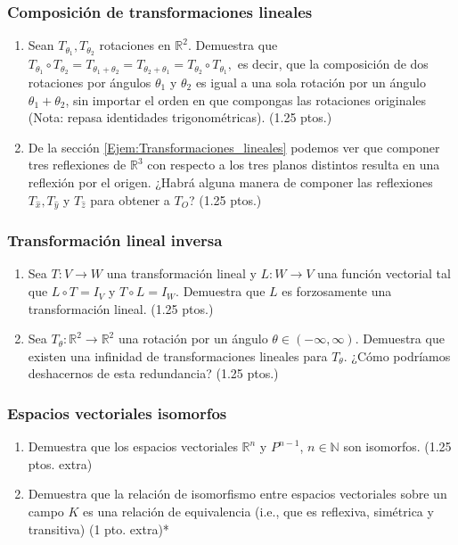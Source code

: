 \documentclass[12pt]{article}
\begin{document}
\subsubsection{Composición de transformaciones lineales}

\begin{enumerate}
    \item Sean $T_{\theta_1}, T_{\theta_2}$ rotaciones en $\mathbb{R}^2$. Demuestra que $T_{\theta_1}\circ T_{\theta_2} = T_{\theta_1+\theta_2} = T_{\theta_2+\theta_1} = T_{\theta_2}\circ T_{\theta_1},$ es decir, que la composición de dos rotaciones por ángulos $\theta_1$ y $\theta_2$ es igual a una sola rotación por un ángulo $\theta_1+\theta_2$, sin importar el orden en que compongas las rotaciones originales (Nota: repasa identidades trigonométricas). (1.25 ptos.)
    \item De la sección \ref{Ejem:Transformaciones_lineales} podemos ver que componer tres reflexiones de $\mathbb{R}^3$ con respecto a los tres planos distintos resulta en una reflexión por el origen. ¿Habrá alguna manera de componer las reflexiones $T_{\hat{x}}, T_{\hat{y}}$ y $T_{\hat{z}}$ para obtener a $T_O$? (1.25 ptos.)
\end{enumerate}

\subsubsection{Transformación lineal inversa}

\begin{enumerate}
    \item Sea $T:V\to W$ una transformación lineal y $L:W\to V$ una función vectorial tal que $L\circ T=I_V$ y $T\circ L=I_W$. Demuestra que $L$ es forzosamente una transformación lineal. (1.25 ptos.)
    \item Sea $T_\theta:\mathbb{R}^2\to\mathbb{R}^2$ una rotación por un ángulo $\theta\in(-\infty,\infty)$. Demuestra que existen una infinidad de transformaciones lineales para $T_\theta$. ¿Cómo podríamos deshacernos de esta redundancia? (1.25 ptos.)
\end{enumerate}

\subsubsection{Espacios vectoriales isomorfos}
\begin{enumerate}
    \item Demuestra que los espacios vectoriales $\mathbb{R}^n$ y $P^{n-1}$, $n\in\mathbb{N}$ son isomorfos. (1.25 ptos. extra)
    \item Demuestra que la relación de isomorfismo entre espacios vectoriales sobre un campo $K$ es una relación de equivalencia (i.e., que es reflexiva, simétrica y transitiva) (1 pto. extra)*

\end{enumerate}
\end{document}
